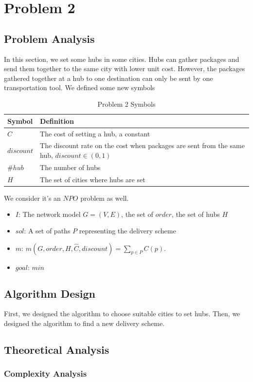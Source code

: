 \documentclass{llncs}
\begin{document}
\section{Problem 2}
\subsection{Problem Analysis}
In this section, we set some hubs in some cities. Hubs can gather packages and send them together to the same city with lower unit cost. However, the packages gathered together at a hub to one
destination can only be sent by one transportation tool. We defined some new symbols \\
\begin{table}
  \caption{Problem 2 Symbols}\label{sym2}
  \centering
  \begin{tabular}{|l|l|}
  \hline
  Symbol &  Definition \\
  \hline
  $\hat{C}$ & The cost of setting a hub, a constant\\
  \hline
  $discount$ & The discount rate on the cost when packages are sent from the same hub, $discount\in (0,1)$\\
  \hline
  $\#hub$ & The number of hubs \\
  \hline
  $H$ & The set of cities where hubs are set \\
  \hline
  \end{tabular}
\end{table}
We consider it's an $NPO$ problem as well.
\begin{itemize}
  \item $I$: The network model $G=(V,E)$, the set of $order$, the set of hubs $H$
  \item $sol$: A set of paths $P$ representing the delivery scheme
  \item $m$: $m(G,order,H,\hat{C},discount)=\sum_{p \in P}C(p)$.
  \item $goal$: $min$
\end{itemize}
\subsection{Algorithm Design}
First, we designed the algorithm to choose suitable cities to set hubs.
Then, we designed the algorithm to find a new delivery scheme.
\subsection{Theoretical Analysis}
\subsubsection{Complexity Analysis}
\end{document}
